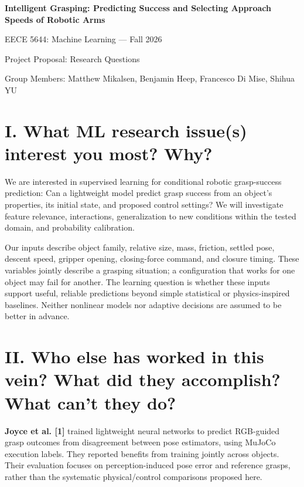 \documentclass[11pt,letterpaper]{article}
\begin{document}
\begin{center}{\fontsize{16}{18}\selectfont\bfseries Intelligent Grasping: Predicting Success and Selecting Approach Speeds of Robotic Arms\par}\end{center}

{\centering\small EECE 5644: Machine Learning — Fall 2026\par}

{\centering\small Project Proposal: Research Questions\par}

{\centering\small Group Members: Matthew Mikalsen, Benjamin Heep, Francesco Di Mise, Shihua YU\par}

\section*{I. What ML research issue(s) interest you most? Why?}

We are interested in supervised learning for conditional robotic grasp-success prediction: Can a lightweight model predict grasp success from an object's properties, its initial state, and proposed control settings? We will investigate feature relevance, interactions, generalization to new conditions within the tested domain, and probability calibration.

Our inputs describe object family, relative size, mass, friction, settled pose, descent speed, gripper opening, closing-force command, and closure timing. These variables jointly describe a grasping situation; a configuration that works for one object may fail for another. The learning question is whether these inputs support useful, reliable predictions beyond simple statistical or physics-inspired baselines. Neither nonlinear models nor adaptive decisions are assumed to be better in advance.

\section*{II. Who else has worked in this vein? What did they accomplish? What can't they do?}

\textbf{Joyce et al. [1]} trained lightweight neural networks to predict RGB-guided grasp outcomes from disagreement between pose estimators, using MuJoCo execution labels. They reported benefits from training jointly across objects. Their evaluation focuses on perception-induced pose error and reference grasps, rather than the systematic physical/control comparisons proposed here.
\end{document}
